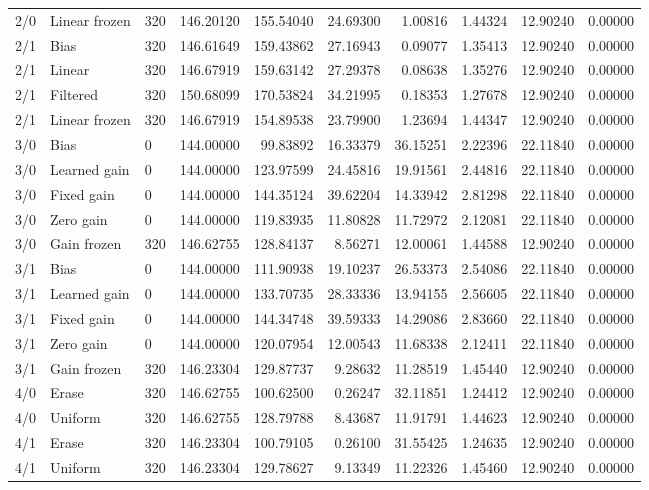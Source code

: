 \begin{longtable}{rllrrrrrrr}
2/0 & Linear frozen & 320 & 146.20120 & 155.54040 & 24.69300 & 1.00816 & 1.44324 & 12.90240 & 0.00000 \\
2/1 & Bias & 320 & 146.61649 & 159.43862 & 27.16943 & 0.09077 & 1.35413 & 12.90240 & 0.00000 \\
2/1 & Linear & 320 & 146.67919 & 159.63142 & 27.29378 & 0.08638 & 1.35276 & 12.90240 & 0.00000 \\
2/1 & Filtered & 320 & 150.68099 & 170.53824 & 34.21995 & 0.18353 & 1.27678 & 12.90240 & 0.00000 \\
2/1 & Linear frozen & 320 & 146.67919 & 154.89538 & 23.79900 & 1.23694 & 1.44347 & 12.90240 & 0.00000 \\
3/0 & Bias & 0 & 144.00000 & 99.83892 & 16.33379 & 36.15251 & 2.22396 & 22.11840 & 0.00000 \\
3/0 & Learned gain & 0 & 144.00000 & 123.97599 & 24.45816 & 19.91561 & 2.44816 & 22.11840 & 0.00000 \\
3/0 & Fixed gain & 0 & 144.00000 & 144.35124 & 39.62204 & 14.33942 & 2.81298 & 22.11840 & 0.00000 \\
3/0 & Zero gain & 0 & 144.00000 & 119.83935 & 11.80828 & 11.72972 & 2.12081 & 22.11840 & 0.00000 \\
3/0 & Gain frozen & 320 & 146.62755 & 128.84137 & 8.56271 & 12.00061 & 1.44588 & 12.90240 & 0.00000 \\
3/1 & Bias & 0 & 144.00000 & 111.90938 & 19.10237 & 26.53373 & 2.54086 & 22.11840 & 0.00000 \\
3/1 & Learned gain & 0 & 144.00000 & 133.70735 & 28.33336 & 13.94155 & 2.56605 & 22.11840 & 0.00000 \\
3/1 & Fixed gain & 0 & 144.00000 & 144.34748 & 39.59333 & 14.29086 & 2.83660 & 22.11840 & 0.00000 \\
3/1 & Zero gain & 0 & 144.00000 & 120.07954 & 12.00543 & 11.68338 & 2.12411 & 22.11840 & 0.00000 \\
3/1 & Gain frozen & 320 & 146.23304 & 129.87737 & 9.28632 & 11.28519 & 1.45440 & 12.90240 & 0.00000 \\
4/0 & Erase & 320 & 146.62755 & 100.62500 & 0.26247 & 32.11851 & 1.24412 & 12.90240 & 0.00000 \\
4/0 & Uniform & 320 & 146.62755 & 128.79788 & 8.43687 & 11.91791 & 1.44623 & 12.90240 & 0.00000 \\
4/1 & Erase & 320 & 146.23304 & 100.79105 & 0.26100 & 31.55425 & 1.24635 & 12.90240 & 0.00000 \\
4/1 & Uniform & 320 & 146.23304 & 129.78627 & 9.13349 & 11.22326 & 1.45460 & 12.90240 & 0.00000 \\
\bottomrule
\end{longtable}

